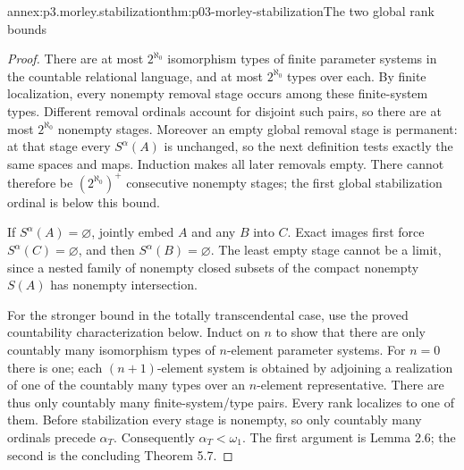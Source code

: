\begin{annexitem}{annex:p3.morley.stabilization}{thm:p03-morley-stabilization}{The two global rank bounds}
\begin{proof}
There are at most \(2^{\aleph_0}\) isomorphism types of finite
parameter systems in the countable relational language, and at
most \(2^{\aleph_0}\) types over each. By finite localization,
every nonempty removal stage occurs among these finite-system
types. Different removal ordinals account for disjoint such
pairs, so there are at most \(2^{\aleph_0}\) nonempty stages.
Moreover an empty global removal stage is permanent: at that
stage every \(S^\alpha(A)\) is unchanged, so the next
definition tests exactly the same spaces and maps. Induction
makes all later removals empty. There cannot therefore be
\((2^{\aleph_0})^+\) consecutive nonempty stages; the first
global stabilization ordinal is below this bound.

If \(S^\alpha(A)=\varnothing\), jointly embed \(A\) and
any \(B\) into \(C\). Exact images first force
\(S^\alpha(C)=\varnothing\), and then
\(S^\alpha(B)=\varnothing\). The least empty stage cannot
be a limit, since a nested family of nonempty closed subsets
of the compact nonempty \(S(A)\) has nonempty intersection.

For the stronger bound in the totally transcendental case,
use the proved countability characterization below. Induct on
\(n\) to show that there are only countably many isomorphism
types of \(n\)-element parameter systems. For \(n=0\)
there is one; each \((n+1)\)-element system is obtained by
adjoining a realization of one of the countably many types
over an \(n\)-element representative. There are thus only
countably many finite-system/type pairs. Every rank localizes
to one of them. Before stabilization every stage is nonempty,
so only countably many ordinals precede \(\alpha_T\).
Consequently \(\alpha_T<\omega_1\). The first argument is
Lemma 2.6; the second is the concluding Theorem 5.7.
\end{proof}
\end{annexitem}

